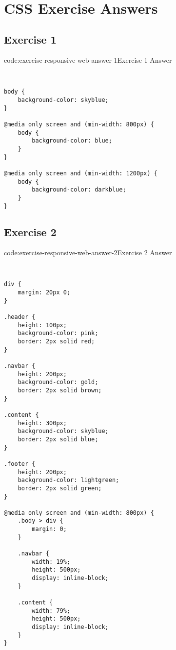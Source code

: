 \section{CSS Exercise Answers}\label{sect:css-exercise-answers}

\subsection*{Exercise 1}

\begin{codeenv}{code:exercise-responsive-web-answer-1}{Exercise 1 Answer}\begin{verbatim}


body {
    background-color: skyblue;
}

@media only screen and (min-width: 800px) {
    body {
        background-color: blue;
    }           
}

@media only screen and (min-width: 1200px) {
    body {
        background-color: darkblue;
    }           
}
\end{verbatim}
\end{codeenv}

\subsection*{Exercise 2}

\begin{codeenv}{code:exercise-responsive-web-answer-2}{Exercise 2 Answer}\begin{verbatim}


div {
    margin: 20px 0;
}

.header {
    height: 100px;
    background-color: pink;
    border: 2px solid red;
}

.navbar {
    height: 200px;
    background-color: gold;
    border: 2px solid brown;
}

.content {
    height: 300px;
    background-color: skyblue;
    border: 2px solid blue;
}

.footer {
    height: 200px;
    background-color: lightgreen;
    border: 2px solid green;
}

@media only screen and (min-width: 800px) {
    .body > div {
        margin: 0;
    }

    .navbar {
        width: 19%;
        height: 500px;
        display: inline-block;
    }

    .content {
        width: 79%;
        height: 500px;
        display: inline-block;
    }
}
\end{verbatim}
\end{codeenv}
